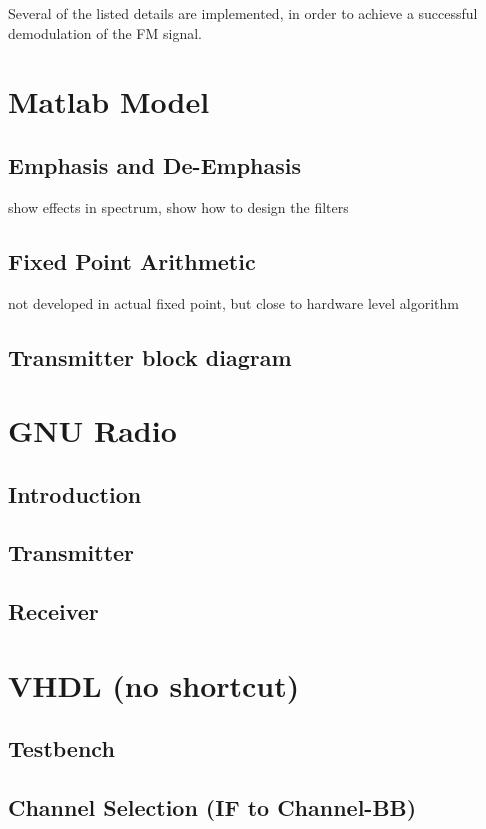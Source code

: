 \noindent
Several of the listed details are implemented, in order to achieve a successful demodulation of the FM signal.

\section{Matlab Model}

\subsection{Emphasis and De-Emphasis}
show effects in spectrum, show how to design the filters

\subsection{Fixed Point Arithmetic}
not developed in actual fixed point, but close to hardware level algorithm



\subsection{Transmitter block diagram}

\section{GNU Radio}
  \subsection{Introduction}
  \subsection{Transmitter}
  \subsection{Receiver}

\section{VHDL (no shortcut)}
  \subsection{Testbench}
  \subsection{Channel Selection (IF to Channel-BB)}
